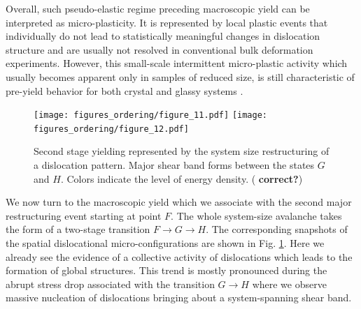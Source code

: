 \documentclass[aps,
superscriptaddress,notitlepage]{revtex4-1}
\begin{document}

Overall, such pseudo-elastic regime preceding macroscopic yield  can be interpreted as micro-plasticity. It is represented by local plastic events that individually do not lead to statistically meaningful changes in dislocation structure and are usually not 
 resolved in conventional bulk deformation experiments.  However,  this  small-scale  intermittent  micro-plastic  activity  which usually becomes apparent  only  in samples of  reduced size, is still  characteristic of pre-yield behavior for  both crystal and glassy systems  \cite{Maas2018-qu,Papanikolaou2017-ld,Sparks2018-zp,sparks2019avalanche,Rizzardi2022-iz,Duan2023-ue}.

\begin{figure}[h!]
\texttt{[image: figures\_ordering/figure\_11.pdf]}
\texttt{[image: figures\_ordering/figure\_12.pdf]}
\caption{Second stage yielding represented by the system size restructuring of a dislocation pattern. Major shear band forms between the states $G$ and $H$. Colors indicate the level of energy density. ( \textbf{correct?}) }
\label{fig:031}
\end{figure}

 
We now  turn to the macroscopic yield which we associate with the second major  restructuring event starting at point $F$. The whole  system-size avalanche  takes the form  of a two-stage  transition  $F \to G \to H$. The corresponding snapshots of the  spatial dislocational micro-configurations are shown in Fig. \ref{fig:031}.  Here we  already  see the evidence of a collective activity of dislocations which leads to  the formation of  global structures. This trend is mostly pronounced during the abrupt stress drop associated with the transition  $G \to H$ where we observe massive nucleation of dislocations bringing about  a system-spanning shear band. 
\end{document}
